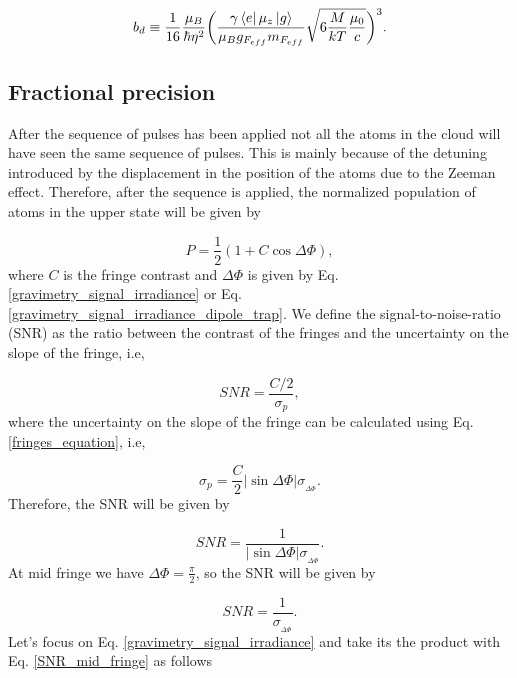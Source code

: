 \documentclass{article}
\begin{document}
\begin{equation}\label{b_parameter_dipole_trap}
    b_{d} \equiv \frac{1}{16} \frac{\mu_{B} }{\hbar \eta^{2}} \bigg( \frac{\gamma \bra{e} \mu_{z} \ket{g}}{\mu_{B} g_{F_{eff}} m_{F_{eff}}} \sqrt{6 \frac{M}{k T} \frac{\mu_{0}}{c} } \bigg)^{3}.
\end{equation}

\subsection{Fractional precision}
After the sequence of pulses has been applied not all the atoms in the cloud will have seen the same sequence of pulses. This is mainly because of the detuning introduced by the displacement in the position of the atoms due to the Zeeman effect. Therefore, after the sequence is applied, the normalized population of atoms in the upper state will be given by

\begin{equation}\label{fringes_equation}
    P = \frac{1}{2}(1+C\cos{\Delta \Phi}),
\end{equation}
%
where $C$ is the fringe contrast and $\Delta \Phi$ is given by Eq. \ref{gravimetry_signal_irradiance} or Eq. \ref{gravimetry_signal_irradiance_dipole_trap}. We define the signal-to-noise-ratio (SNR) as the ratio between the contrast of the fringes and the uncertainty on the slope of the fringe, i.e,

\begin{equation}
    SNR = \frac{C/2}{\sigma_{p}}, 
\end{equation}
%
where the uncertainty on the slope of the fringe can be calculated using Eq. \ref{fringes_equation}, i.e,

\begin{equation}
    \sigma_{p} = \frac{C}{2} |\sin{\Delta \Phi}| \sigma_{_{\Delta \Phi}}.
\end{equation}
%
Therefore, the SNR will be given by

\begin{equation}
    SNR = \frac{1}{|\sin{\Delta \Phi}|  \sigma_{_{\Delta \Phi}}}.
\end{equation}
%
At mid fringe we have $\Delta \Phi = \frac{\pi}{2}$, so the SNR will be given by

\begin{equation}\label{SNR_mid_fringe}
    SNR = \frac{1}{\sigma_{_{\Delta \Phi}}}.
\end{equation}
%
Let's focus on Eq. \ref{gravimetry_signal_irradiance} and take its the product with Eq. \ref{SNR_mid_fringe} as follows
\end{document}
